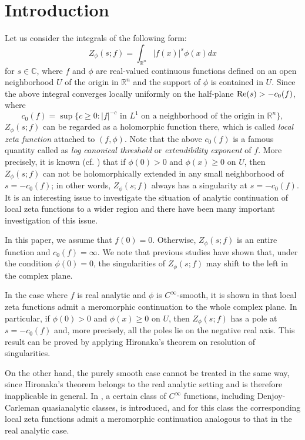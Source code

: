 \documentclass[12pt]{amsart}
\numberwithin{equation}{section}
\theoremstyle{definition}
\theoremstyle{remark}
\newcommand{\R}{{\mathbb R}}
\newcommand{\C}{{\mathbb C}}
\newcommand{\1}{{\bf 1}}
\begin{document}
\section{Introduction}
Let us
consider the integrals of the 
following form:
\begin{equation}\label{eqn:1.1}
Z_{\phi}(s;f)=\int_{\R^n} 
|f(x)|^s \phi(x) dx
\end{equation}
for $s\in\C$, 
where $f$ and $\phi$ are 
real-valued continuous functions defined 
on an open neighborhood $U$ of the origin in 
$\R^n$ and 
the support of $\phi$ is contained 
in $U$. 
Since the above integral 
converges locally uniformly on the half-plane
${\rm Re}(s)>-c_0(f)$, where
\begin{equation}
c_0(f)=\sup\{
c\geq 0:|f|^{-c}
\mbox{ in $L^1$ on a neighborhood 
of the origin in } \R^n\},
\end{equation}
$Z_{\phi}(s;f)$ can be regarded 
as a holomorphic function there, 
which is called 
{\it local zeta function} attached to $(f,\phi)$. 
Note that the above $c_0(f)$ 
is a famous quantity called as
{\it log canonical threshold}
or 
{\it extendibility exponent} of $f$. 
More precisely, 
it is known (cf. \cite{KaN19}) that
if $\phi(0)>0$ and $\phi(x)\geq 0$ on $U$, 
then $Z_{\phi}(s;f)$ 
can not be holomorphically 
extended in any small neighborhood 
of $s=-c_0(f)$; in other words, 
$Z_{\phi}(s;f)$
always has a singularity at 
$s=-c_0(f)$. 
It is an interesting issue to investigate
the situation of analytic continuation of 
local zeta functions 
to a wider region and 
there have been many important 
investigation of this issue.

In this paper, we assume that $f(0)=0$.
Otherwise, $Z_{\phi}(s;f)$ is an entire function 
and $c_0(f)=\infty$.
We note that previous studies \cite{CKN13, KaN16tams} 
have shown that, 
under the condition $\phi(0)=0$, 
the singularities of $Z_{\phi}(s;f)$ may shift 
to the left in the complex plane.

In the case where $f$ is real analytic and 
$\phi$ is $C^{\infty}$-smooth, 
it is shown in \cite{BeG69, Ati70} that 
local zeta functions admit a meromorphic continuation 
to the whole complex plane. 
In particular, if $\phi(0)>0$ and $\phi(x)\ge 0$ on $U$, 
then $Z_{\phi}(s;f)$ has a pole at $s=-c_0(f)$ and, 
more precisely, all the poles lie on the negative real axis. 
This result can be proved by applying 
Hironaka's theorem \cite{Hir64}
on resolution of singularities.

On the other hand, 
the purely smooth case cannot 
be treated in the same way, 
since Hironaka's theorem belongs to the real analytic setting 
and is therefore inapplicable in general. 
In \cite{KaN16jmsut}, 
a certain class of $C^{\infty}$ functions, 
including Denjoy-Carleman quasianalytic classes,  
is introduced, 
and for this class the corresponding local zeta functions 
admit a meromorphic continuation analogous 
to that in the real analytic case.
\end{document}
